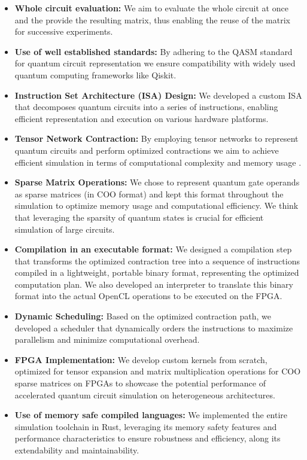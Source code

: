 \documentclass[12pt,oneside,a4paper]{article}
\begin{document}
\begin{itemize}
    \item \textbf{Whole circuit evaluation:} We aim to evaluate the whole circuit at once and the provide the resulting matrix, thus enabling the reuse of the matrix for successive experiments.
    \item \textbf{Use of well established standards:} By adhering to the QASM standard\cite{cross2017openquantumassemblylanguage} for quantum circuit representation we ensure compatibility with widely used quantum computing frameworks like Qiskit.
    \item \textbf{Instruction Set Architecture (ISA) Design:} We developed a custom ISA that decomposes quantum circuits into a series of instructions, enabling efficient representation and execution on various hardware platforms.
    \item \textbf{Tensor Network Contraction:} By employing tensor networks to represent quantum circuits and perform optimized contractions we aim to achieve efficient simulation in terms of computational complexity and memory usage \cite{pan2023efficientquantumcircuitsimulation}.
    \item \textbf{Sparse Matrix Operations:} We chose to represent quantum gate operands as sparse matrices (in COO format) and kept this format throughout the simulation to optimize memory usage and computational efficiency. We think that leveraging the sparsity of quantum states is crucial for efficient simulation of large circuits.
    \item \textbf{Compilation in an executable format:} We designed a compilation step that transforms the optimized contraction tree into a sequence of instructions compiled in a lightweight, portable binary format, representing the optimized computation plan. We also developed an interpreter to translate this binary format into the actual OpenCL operations to be executed on the FPGA.
    \item \textbf{Dynamic Scheduling:} Based on the optimized contraction path, we developed a scheduler that dynamically orders the instructions to maximize parallelism and minimize computational overhead.
    \item \textbf{FPGA Implementation:} We develop custom kernels from scratch, optimized for tensor expansion and matrix multiplication operations for COO sparse matrices on FPGAs to showcase the potential performance of accelerated quantum circuit simulation on heterogeneous architectures.
    \item \textbf{Use of memory safe compiled languages:} We implemented the entire simulation toolchain in Rust, leveraging its memory safety features and performance characteristics to ensure robustness and efficiency, along its extendability and maintainability.
\end{itemize}
\end{document}
